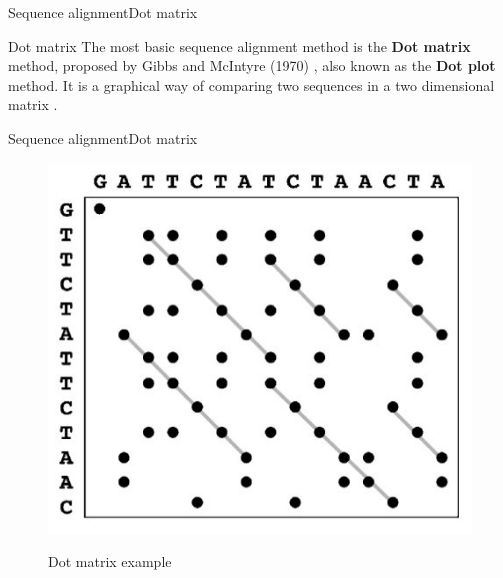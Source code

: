 \documentclass[10pt]{beamer}
\begin{document}
{%
\begin{frame}{Sequence alignment}{Dot matrix}

\begin{block}{Dot matrix}
\centering
The most basic sequence alignment method is the \textbf{Dot matrix} method, proposed by Gibbs and McIntyre (1970) \cite{gibbs1970diagram}, also known
as the \textbf{Dot plot} method. It is a graphical way of comparing two sequences in a two 
dimensional matrix \cite{xiong2006essential}.
\end{block}

\end{frame}

\begin{frame}{Sequence alignment}{Dot matrix}

\begin{figure}[]
 \centering
    \includegraphics[width=\textwidth,height=0.7\textheight,keepaspectratio]{img/alignment/dot.jpg}
    \label{img:uniprot}
    \caption{Dot matrix example}
\end{figure}
\end{frame}

}
\end{document}
